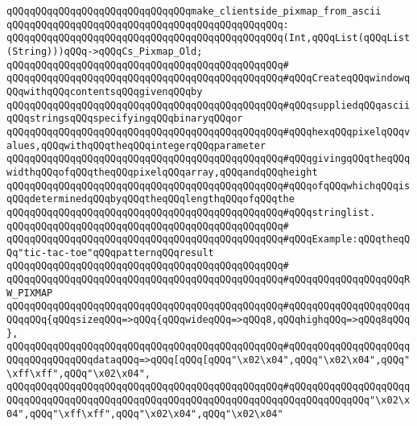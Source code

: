 \newline
\verb|qQQqqQQqqQQqqQQqqQQqqQQqqQQqqQQqmake_clientside_pixmap_from_ascii|\newline
\verb|qQQqqQQqqQQqqQQqqQQqqQQqqQQqqQQqqQQqqQQqqQQqqQQq:|\newline
\verb|qQQqqQQqqQQqqQQqqQQqqQQqqQQqqQQqqQQqqQQqqQQqqQQq(Int,qQQqList(qQQqList(String)))qQQq->qQQqCs_Pixmap_Old;|\newline
\verb|qQQqqQQqqQQqqQQqqQQqqQQqqQQqqQQqqQQqqQQqqQQqqQQq#|\newline
\verb|qQQqqQQqqQQqqQQqqQQqqQQqqQQqqQQqqQQqqQQqqQQqqQQq#qQQqCreateqQQqwindowqQQqwithqQQqcontentsqQQqgivenqQQqby|\newline
\verb|qQQqqQQqqQQqqQQqqQQqqQQqqQQqqQQqqQQqqQQqqQQqqQQq#qQQqsuppliedqQQqasciiqQQqstringsqQQqspecifyingqQQqbinaryqQQqor|\newline
\verb|qQQqqQQqqQQqqQQqqQQqqQQqqQQqqQQqqQQqqQQqqQQqqQQq#qQQqhexqQQqpixelqQQqvalues,qQQqwithqQQqtheqQQqintegerqQQqparameter|\newline
\verb|qQQqqQQqqQQqqQQqqQQqqQQqqQQqqQQqqQQqqQQqqQQqqQQq#qQQqgivingqQQqtheqQQqwidthqQQqofqQQqtheqQQqpixelqQQqarray,qQQqandqQQqheight|\newline
\verb|qQQqqQQqqQQqqQQqqQQqqQQqqQQqqQQqqQQqqQQqqQQqqQQq#qQQqofqQQqwhichqQQqisqQQqdeterminedqQQqbyqQQqtheqQQqlengthqQQqofqQQqthe|\newline
\verb|qQQqqQQqqQQqqQQqqQQqqQQqqQQqqQQqqQQqqQQqqQQqqQQq#qQQqstringlist.|\newline
\verb|qQQqqQQqqQQqqQQqqQQqqQQqqQQqqQQqqQQqqQQqqQQqqQQq#|\newline
\verb|qQQqqQQqqQQqqQQqqQQqqQQqqQQqqQQqqQQqqQQqqQQqqQQq#qQQqExample:qQQqtheqQQq"tic-tac-toe"qQQqpatternqQQqresult|\newline
\verb|qQQqqQQqqQQqqQQqqQQqqQQqqQQqqQQqqQQqqQQqqQQqqQQq#|\newline
\verb|qQQqqQQqqQQqqQQqqQQqqQQqqQQqqQQqqQQqqQQqqQQqqQQq#qQQqqQQqqQQqqQQqqQQqRW_PIXMAP|\newline
\verb|qQQqqQQqqQQqqQQqqQQqqQQqqQQqqQQqqQQqqQQqqQQqqQQq#qQQqqQQqqQQqqQQqqQQqqQQqqQQq{qQQqsizeqQQq=>qQQq{qQQqwideqQQq=>qQQq8,qQQqhighqQQq=>qQQq8qQQq},|\newline
\verb|qQQqqQQqqQQqqQQqqQQqqQQqqQQqqQQqqQQqqQQqqQQqqQQq#qQQqqQQqqQQqqQQqqQQqqQQqqQQqqQQqqQQqdataqQQq=>qQQq[qQQq[qQQq"\x02\x04",qQQq"\x02\x04",qQQq"\xff\xff",qQQq"\x02\x04",|\newline
\verb|qQQqqQQqqQQqqQQqqQQqqQQqqQQqqQQqqQQqqQQqqQQqqQQq#qQQqqQQqqQQqqQQqqQQqqQQqqQQqqQQqqQQqqQQqqQQqqQQqqQQqqQQqqQQqqQQqqQQqqQQqqQQqqQQqqQQq"\x02\x04",qQQq"\xff\xff",qQQq"\x02\x04",qQQq"\x02\x04"|\newline
